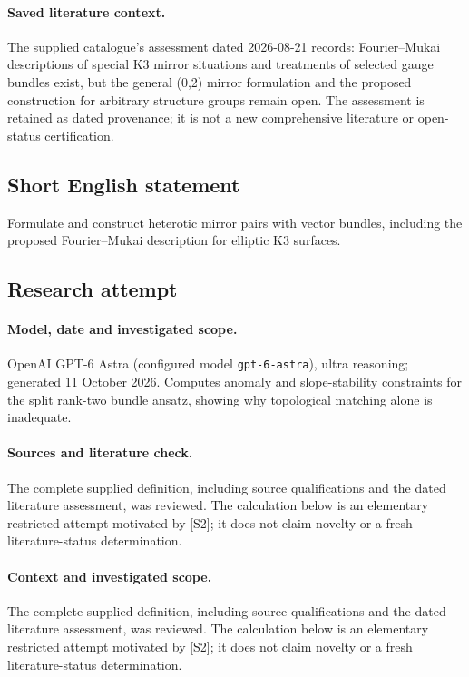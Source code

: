 \documentclass[11pt]{article}
\begin{document}
\paragraph{Saved literature context.} The supplied catalogue's assessment dated 2026-08-21 records: Fourier--Mukai descriptions of special K3 mirror situations and treatments of selected gauge bundles exist, but the general (0,2) mirror formulation and the proposed construction for arbitrary structure groups remain open. The assessment is retained as dated provenance; it is not a new comprehensive literature or open-status certification.
\subsection{Short English statement}
Formulate and construct heterotic mirror pairs with vector bundles, including the proposed Fourier--Mukai description for elliptic K3 surfaces.
\subsection{Research attempt}
\paragraph{Model, date and investigated scope.}
OpenAI GPT-6 Astra (configured model \texttt{gpt-6-astra}), ultra reasoning; generated 11 October 2026. Computes anomaly and slope-stability constraints for the split rank-two bundle ansatz, showing why topological matching alone is inadequate.

\paragraph{Sources and literature check.}
The complete supplied definition, including source qualifications and the dated literature assessment, was reviewed. The calculation below is an elementary restricted attempt motivated by [S2]; it does not claim novelty or a fresh literature-status determination.

\paragraph{Context and investigated scope.} The complete supplied definition, including source qualifications and the dated literature assessment, was reviewed. The calculation below is an elementary restricted attempt motivated by [S2]; it does not claim novelty or a fresh literature-status determination.
\end{document}
